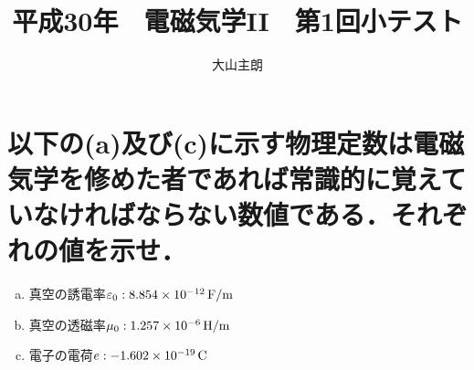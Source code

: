 \documentclass[dvipdfmx]{ujarticle}
\begin{document}
\title{平成30年　電磁気学II　第1回小テスト}
\date{}
\author{大山主朗}

\maketitle

\section{以下の(a)及び(c)に示す物理定数は電磁気学を修めた者であれば常識的に覚えていなければならない数値である．それぞれの値を示せ．}
\begin{enumerate}[(a)]
	\item 真空の誘電率$\varepsilon_{0}:8.854 \times 10^{-12}\,\rm{F/m}$
	\item 真空の透磁率$\mu_{0}:1.257 \times 10^{-6}\,\rm{H/m}$
	\item 電子の電荷$e:-1.602 \times 10^{-19}\,\rm{C}$
\end{enumerate}
\end{document}
